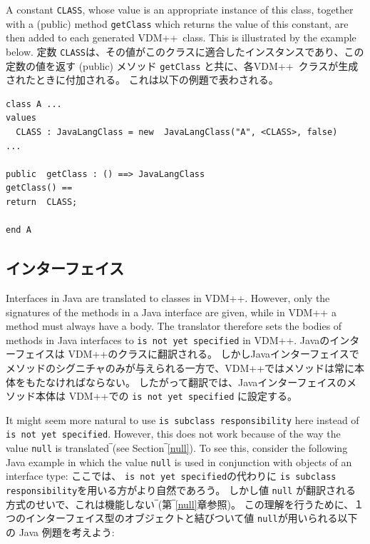 \documentclass[\pformat,12pt]{jarticle}
\newcommand{\VDM}{VDM++}
\begin{document}
A constant \texttt{CLASS}, whose value is an appropriate instance of
this class, together with a (public) method \texttt{getClass} which
returns the value of this constant, are then added to each generated
\VDM\ class. This is illustrated by the example below. 
定数 \texttt{CLASS}は、その値がこのクラスに適合したインスタンスであり、この定数の値を返す (public) メソッド \texttt{getClass} と共に、各\VDM\ クラスが生成されたときに付加される。
これは以下の例題で表わされる。

\begin{small}
\begin{verbatim}
class A ...
values 
  CLASS : JavaLangClass = new  JavaLangClass("A", <CLASS>, false)
...

public  getClass : () ==> JavaLangClass
getClass() == 
return  CLASS;

end A
\end{verbatim}
\end{small}

\subsection{インターフェイス}\label{interface}

Interfaces in Java are translated to classes in VDM++. However, only
the signatures of the methods in a Java interface are given, while in
VDM++ a method must always have a body. The translator therefore sets
the bodies of methods in Java interfaces to \texttt{is not yet
  specified} in VDM++. 
Javaのインターフェイスは VDM++のクラスに翻訳される。
しかしJavaインターフェイスでメソッドのシグニチャのみが与えられる一方で、VDM++ではメソッドは常に本体をもたなければならない。 
したがって翻訳では、Javaインターフェイスのメソッド本体は VDM++での \texttt{is not yet specified} に設定する。

It might seem more natural to use \texttt{is subclass responsibility}
  here instead of \texttt{is not yet specified}. However, this does
  not work because of the way the value \texttt{null} is
  translated‾(see Section‾\ref{null}). To see this, consider the
  following Java example in which the value \texttt{null} is used in
  conjunction with objects of an interface type:
ここでは、 \texttt{is not yet specified}の代わりに \texttt{is subclass responsibility}を用いる方がより自然であろう。
しかし値 \texttt{null} が翻訳される方式のせいで、これは機能しない‾(第‾\ref{null}章参照)。 
この理解を行うために、１つのインターフェイス型のオブジェクトと結びついて値 \texttt{null}が用いられる以下の Java 例題を考えよう:
\end{document}
